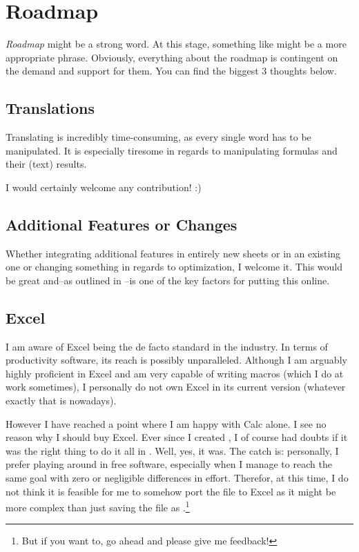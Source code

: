 \section{Roadmap}
\label{sec:roadmap}

\emph{Roadmap} might be a strong word.
At this stage, something like  might be a more appropriate phrase.
Obviously, everything about the roadmap is contingent on the demand and support for them.
You can find the biggest 3 thoughts below.

\subsection{Translations}
\label{subsec:translations}

Translating \tfn is incredibly time-consuming, as every single word has to be manipulated.
It is especially tiresome in regards to manipulating formulas and their (text) results.

I would certainly welcome any contribution! :)

\subsection{Additional Features or Changes}
\label{subsec:additional-features}

Whether integrating additional features in entirely new sheets or in an existing one or changing something in regards to optimization, I welcome it.
This would be great and--as outlined in --is one of the key factors for putting this online.

\subsection{Excel}
\label{subsec:excel}

I am aware of Excel being the de facto standard in the industry.
In terms of productivity software, its reach is possibly unparalleled.
Although I am arguably highly proficient in Excel and am very capable of writing macros (which I do at work sometimes), I personally do not own Excel in its current version (whatever exactly that is nowadays).

However I have reached a point where I am happy with Calc alone.
I see no reason why I should buy Excel.
Ever since I created \tfn, I of course had doubts if it was the right thing to do it all in \loc.
Well, yes, it was.
The catch is: personally, I prefer playing around in free software, especially when I manage to reach the same goal with zero or negligible differences in effort.
Therefor, at this time, I do not think it is feasible for me to somehow port the file to Excel as it might be more complex than just saving the file as .\footnote{But if you want to, go ahead and please give me feedback!}

